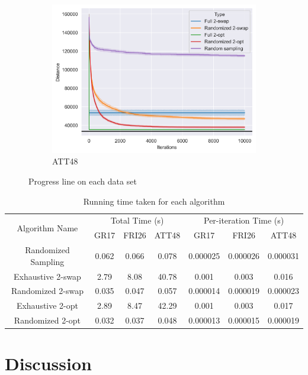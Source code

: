 \documentclass{article}
\begin{document}
\begin{figure}[h]
\begin{subfigure}[b]{0.33\textwidth}
        \includegraphics[width=\textwidth]{images/att48_plot.png}
        \caption{ATT48}
    \end{subfigure}
    \caption{Progress line on each data set}
    \label{fig:progress}
\end{figure}

\begin{table}[htbp]
    \centering
    \begin{tabular}{|c|ccc|ccc|}
        \hline
        \multirow{2}{*}{Algorithm Name} & \multicolumn{3}{c|}{Total Time (s)} & \multicolumn{3}{c|}{Per-iteration Time (s)} \\
                                        & GR17 & FRI26 & ATT48 & GR17 & FRI26 & ATT48 \\
        \hline
        \hline
        Randomized Sampling & 0.062 & 0.066 & 0.078 & 0.000025 & 0.000026 & 0.000031 \\
        Exhaustive 2-swap & 2.79 & 8.08 & 40.78 & 0.001 & 0.003 & 0.016 \\
        Randomized 2-swap & 0.035 & 0.047 & 0.057 & 0.000014 & 0.000019 & 0.000023 \\
        Exhaustive 2-opt & 2.89 & 8.47 & 42.29 & 0.001 & 0.003 & 0.017 \\
        Randomized 2-opt & 0.032 & 0.037 & 0.048 & 0.000013 & 0.000015 & 0.000019 \\
        \hline
    \end{tabular}
    \caption{Running time taken for each algorithm}
    \label{table:time}
\end{table}

\section{Discussion}
\end{document}
